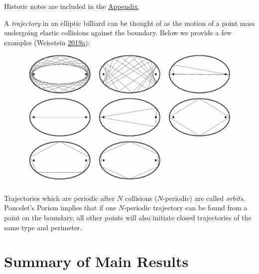 \documentclass[]{article}
\begin{document}
Historic notes are included in the \href{appendices.html}{Appendix}.

A \emph{trajectory} in an elliptic billiard can be thought of as the motion of a point mass undergoing elastic collisions against the boundary. Below we provide a few examples (Weisstein \protect\hyperlink{ref-mw}{2019}\protect\hyperlink{ref-mw}{a}):

\begin{figure}[H]

{\centering \includegraphics[width=0.5\linewidth]{pics/orbits_mathworld} 

}

\end{figure}

Trajectories which are periodic after \(N\) collisions (\(N\)-periodic) are called \emph{orbits}. Poncelet's Porism implies that if one \(N\)-periodic trajectory can be found from a point on the boundary, all other points will also initiate closed trajectories of the same type and perimeter.

\hypertarget{summary-of-main-results}{%
\section{Summary of Main Results}\label{summary-of-main-results}}
\end{document}

